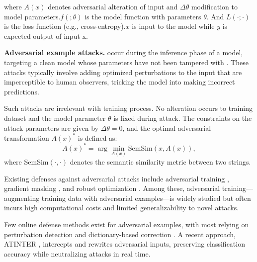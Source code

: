 where $A(x)$ denotes adversarial alteration of input and $\Delta\theta$  modification to model parameters.$f(;\theta)$ is the model function with parameters $\theta$. And $L(\cdot;\cdot)$ is the loss function (e.g., cross-entropy).$x$ is input to the model while $y$ is expected output of input x.


\textbf{Adversarial example attacks.} occur during the inference phase of a model, targeting a clean model whose parameters have not been tampered with \cite{ae1}. These attacks typically involve adding optimized perturbations to the input that are imperceptible to human observers, tricking the model into making incorrect predictions. 

Such attacks are irrelevant with training process. No alteration occurs to training dataset and the model parameter $\theta$ is fixed during attack. The constraints on the attack parameters are given by $\Delta\theta = 0$, and the optimal adversarial transformation \( A(x)^* \) is defined as:
\begin{equation}
A(x)^* = \arg\min_{A(x)} \text{SemSim}(x, A(x)),
\end{equation}
where \( \text{SemSim}(\cdot, \cdot) \) denotes the semantic similarity metric between two strings.

Existing defenses against adversarial attacks include adversarial training \cite{adversarial_training}, gradient masking \cite{gradient_masking}, and robust optimization \cite{robust}. Among these, adversarial training—augmenting training data with adversarial examples—is widely studied but often incurs high computational costs and limited generalizability to novel attacks.

Few online defense methods exist for adversarial examples, with most relying on perturbation detection and dictionary-based correction \cite{ae_perturbation_control} \cite{ae_perturbation_control2}. A recent approach, ATINTER \cite{ATINTER}, intercepts and rewrites adversarial inputs, preserving classification accuracy while neutralizing attacks in real time.





